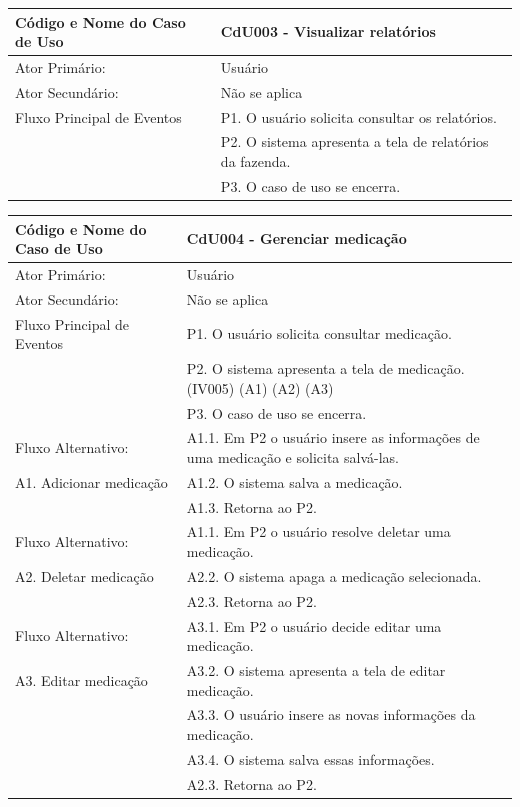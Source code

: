 \documentclass[12pt]{article}
\begin{document}
\begin{titlepage}
\begin{center}
  \begin{tabular}{ | l |  p{10cm} |}
    \hline
    Código e Nome do Caso de Uso & CdU003 - Visualizar relatórios \\ \hline
    Ator Primário: & Usuário \\ 
    Ator Secundário: & Não se aplica \\ \hline
    Fluxo Principal de Eventos & P1. O usuário solicita consultar os relatórios. \\
			       & P2. O sistema apresenta a tela de relatórios da fazenda. \\
                               & P3. O caso de uso se encerra. \\
    \hline
  \end{tabular}
\end{center}



\begin{center}
  \begin{tabular}{ | l |  p{10cm} |}
    \hline
    Código e Nome do Caso de Uso & CdU004 - Gerenciar medicação \\ \hline
    Ator Primário: & Usuário \\ 
    Ator Secundário: & Não se aplica \\ \hline
    Fluxo Principal de Eventos & P1. O usuário solicita consultar medicação. \\
			       & P2. O sistema apresenta a tela de medicação. (IV005) (A1) (A2) (A3) \\
                               & P3. O caso de uso se encerra. \\ \hline
    Fluxo Alternativo:         & A1.1. Em P2 o usuário insere as informações de uma medicação e solicita salvá-las. \\
    A1. Adicionar medicação    & A1.2. O sistema salva a medicação. \\ 
			       & A1.3. Retorna ao P2. \\ \hline
    Fluxo Alternativo:         & A1.1. Em P2 o usuário resolve deletar uma medicação. \\
    A2. Deletar medicação      & A2.2. O sistema apaga a medicação selecionada. \\
			       & A2.3. Retorna ao P2. \\ \hline
    Fluxo Alternativo:         & A3.1. Em P2 o usuário decide editar uma medicação. \\
    A3. Editar medicação       & A3.2. O sistema apresenta a tela de editar medicação. \\
			       & A3.3. O usuário insere as novas informações da medicação. \\
                               & A3.4. O sistema salva essas informações. \\
			       & A2.3. Retorna ao P2. \\
    \hline
  \end{tabular}
\end{center}


\end{titlepage}
\end{document}
